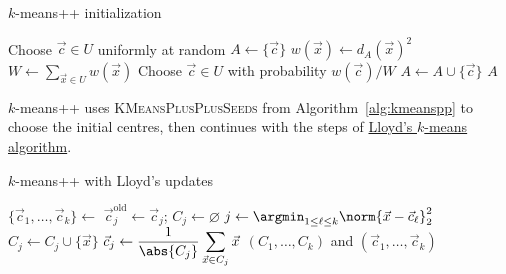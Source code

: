 \documentclass[a4paper,12pt,oneside]{report}
\begin{document}
\begin{framedalgo}{$k$-means++ initialization}\label{alg:kmeanspp}
\begin{algorithmic}[1]
    \State Choose $\vec c\in U$ uniformly at random
    \State $A\gets\{\vec c\}$
        \State $w(\vec x)\gets d_A(\vec x)^2$
      \EndFor
      \State $W\gets\displaystyle\sum_{\vec x\in U}w(\vec x)$
      \State Choose $\vec c\in U$ with probability $w(\vec c)/W$
      \State $A\gets A\cup\{\vec c\}$
    \EndWhile
    \State \Return $A$
  \EndFunction
\end{algorithmic}
\end{framedalgo}

$k$-means++ uses \textsc{KMeansPlusPlusSeeds} from
Algorithm~\ref{alg:kmeanspp} to choose the initial centres, then
continues with the steps of
\hyperref[alg:lloyd]{Lloyd's $k$-means algorithm}.

\begin{framedalgo}{$k$-means++ with Lloyd's updates}
\label{alg:kmeanspp-lloyd}
\begin{algorithmic}[1]
    \State $\{\vec c_1,\ldots,\vec c_k\}\gets$
    \Repeat
        \State $\vec c_j^{\mathrm{old}}\gets\vec c_j$;
          $C_j\gets\varnothing$
      \EndFor
        \State $j\gets\argmin_{1\leq\ell\leq k}
          \norm{\vec x-\vec c_\ell}_2^2$
        \State $C_j\gets C_j\cup\{\vec x\}$
      \EndFor
        \State $\vec c_j\gets\dfrac{1}{\abs{C_j}}
          \displaystyle\sum_{\vec x\in C_j}\vec x$
      \EndFor
    \State \Return $(C_1,\ldots,C_k)$ and
      $(\vec c_1,\ldots,\vec c_k)$
  \EndFunction
\end{algorithmic}
\end{framedalgo}
\end{document}
